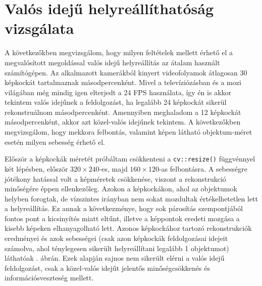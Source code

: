 \section{Valós idejű helyreállíthatóság vizsgálata}

A következőkben megvizsgálom, hogy milyen feltételek mellett érhető el a megvalósított megoldással valós idejű helyreállítás az átalam használt számítógépen. Az alkalmazott kamerákból kinyert videofolyamok átlagosan 30 képkockát tartalmaznak másodpercenként. Mivel a televíziózásban és a mozi világában még mindig igen elterjedt a 24 FPS használata, így én is akkor tekintem valós idejűnek a feldolgozást, ha legalább 24 képkockát sikerül rekonstruálnom másodpercenként. Amennyiben meghaladom a 12 képkockát másodpercenként, akkor azt közel-valós idejűnek tekintem. A következőkben megvizsgálom, hogy mekkora felbontás, valamint képen látható objektum-méret esetén milyen sebesség érhető el.

Először a képkockák méretét próbáltam csökkenteni a \texttt{cv::resize()} függvénnyel két lépésben, először $320\times 240$-es, majd $160\times 120$-as felbontásra. A sebességre jótékony hatással volt a képméretek csökkenése, viszont a rekonstrukció minőségére éppen ellenkezőleg. Azokon a képkockákon, ahol az objektumok helyben forogtak, de vízszintes irányban nem sokat mozdultak értékelhetetlen lett a helyreállítás. Ez annak a következménye, hogy sok párosítás szempontjából fontos pont a kicsinyítés miatt eltűnt, illetve a képpontok eredeti mozgása a kisebb képeken elhanyagolható lett. Azonos képkockához tartozó rekonstrukciók eredményei és azok sebességei (csak azon képkockák feldolgozásai idejeit számolva, ahol ténylegesen sikerült helyreállítani legalább 1 objektumot) láthatóak . ábrán. Ezek alapján sajnos nem sikerült elérni a valós idejű feldolgozást, csak a közel-valós idejűt jelentős minőségcsökkenés és információsveszteség mellett.

